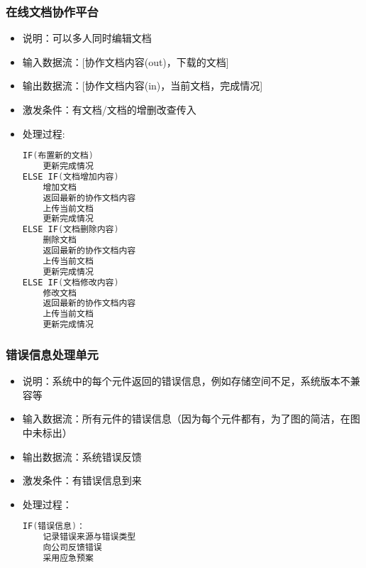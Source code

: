             \subsubsection{在线文档协作平台}
            \begin{itemize}
                \item 说明：可以多人同时编辑文档
                \item 输入数据流：[协作文档内容(out)，下载的文档]
                \item 输出数据流：[协作文档内容(in)，当前文档，完成情况]
                \item 激发条件：有文档/文档的增删改查传入
                \item 处理过程: 
\begin{lstlisting}[language=C, caption=在线文档协作平台, label={code:first-code}]
IF(布置新的文档)
    更新完成情况
ELSE IF(文档增加内容)
    增加文档
    返回最新的协作文档内容
    上传当前文档
    更新完成情况
ELSE IF(文档删除内容)
    删除文档
    返回最新的协作文档内容
    上传当前文档
    更新完成情况
ELSE IF(文档修改内容)
    修改文档
    返回最新的协作文档内容
    上传当前文档
    更新完成情况
\end{lstlisting}
            \end{itemize}
            \subsubsection{错误信息处理单元}
            \begin{itemize}
                \item 说明：系统中的每个元件返回的错误信息，例如存储空间不足，系统版本不兼容等
                \item 输入数据流：所有元件的错误信息（因为每个元件都有，为了图的简洁，在图中未标出）
                \item 输出数据流：系统错误反馈
                \item 激发条件：有错误信息到来
                \item 处理过程：
\begin{lstlisting}[language=C, caption=错误信息处理单元, label={code:first-code}]
IF(错误信息)：
    记录错误来源与错误类型
    向公司反馈错误
    采用应急预案
\end{lstlisting}
            \end{itemize}


